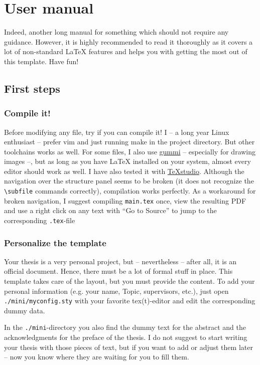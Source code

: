 \documentclass[\myrootdir/main.tex]{subfiles}
\begin{document}
\chapter{User manual}

Indeed, another long manual for something which should not require any guidance.
However, it is highly recommended to read it thoroughly as it covers a lot of non-standard LaTeX features and helps you with getting the most out of this template.
Have fun!

\section{First steps}

\subsection{Compile it!}

Before modifying any file, try if you can compile it!
I -- a long year Linux enthusiast -- prefer vim and just running make in the project directory.
But other toolchains works as well.
For some files, I also use \href{https://github.com/alexandervdm/gummi}{gummi} -- especially for drawing images --, but as long as you have LaTeX installed on your system, almost every editor should work as well.
I have also tested it with \href{http://www.texstudio.org/}{TeXstudio}.
Although the navigation over the structure panel seems to be broken (it does not recognize the \texttt{\textbackslash subfile} commands correctly), compilation works perfectly.
As a workaround for broken navigation, I suggest compiling \texttt{main.tex} once, view the resulting PDF and use a right click on any text with \enquote{Go to Source} to jump to the corresponding \texttt{.tex}-file


\subsection{Personalize the template}

Your thesis is a very personal project, but -- nevertheless -- after all, it is an official document.
Hence, there must be a lot of formal stuff in place.
This template takes care of the layout, but you must provide the content.
To add your personal information (e.g. your name, Topic, supervisors, etc.), just open \texttt{./mini/myconfig.sty} with your favorite tex(t)-editor and edit the corresponding dummy data.

In the \texttt{./mini}-directory you also find the dummy text for the abstract and the acknowledgments for the preface of the thesis.
I do not suggest to start writing your thesis with those pieces of text, but if you want to add or adjust them later -- now you know where they are waiting for you to fill them.
\end{document}

